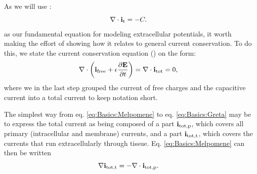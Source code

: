 

\subsection{ }
As we will use :
\begin{equation}
{\bf \nabla} \cdot {\bf i_\text{t}} = -C.
\label{eq:Basics:Greta}
\end{equation}
as our fundamental equation for modeling extracellular potentials, it worth making the effort of showing how it relates to general current conservation. To do this, we state the current conservation equation () on the form:
\begin{equation}
{\bf \nabla} \cdot \left( {\bf i}_ \text{free} +  \epsilon \frac{\partial {\bf E}}{\partial t} \right) = {\bf \nabla} \cdot {\bf i}_\text{tot}  = 0,
\label{eq:Basics:Melpomene}
\end{equation}
where we in the last step grouped the current of free charges and the capacitive current into a total current to keep notation short.

The simplest way from eq. \ref{eq:Basics:Melpomene} to eq. \ref{eq:Basics:Greta} may be to express the total current as being composed of a part ${\bf i}_\text{tot,p}$, which covers all primary (intracellular and membrane)
currents, and a part ${\bf i}_\text{tot,t}$, which covers the currents that run extracellularly through tissue. Eq. \ref{eq:Basics:Melpomene} can then be written
\begin{equation}
{\bf \nabla} {\bf i}_\text{tot,t} = - {\bf \nabla} \cdot {\bf i}_\text{tot,p}.
\label{eq:Basics:Melpomene2}
\end{equation}

